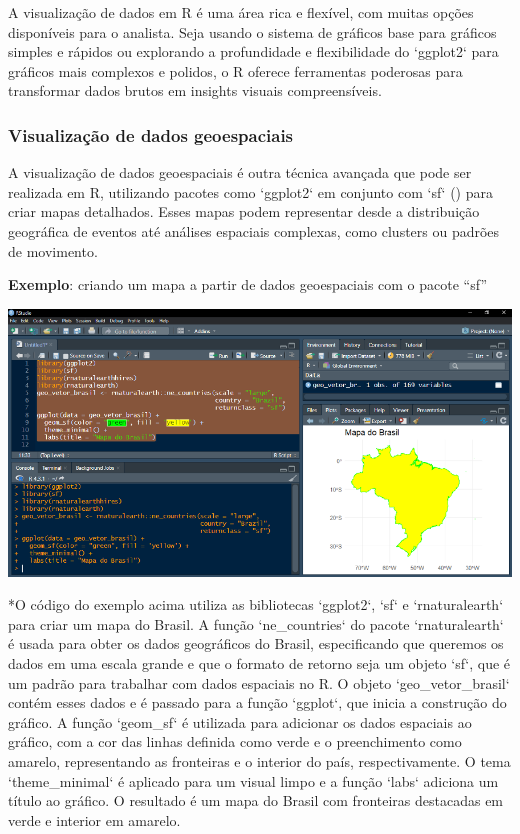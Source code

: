 \documentclass[
]{book}
\begin{document}
A visualização de dados em R é uma área rica e flexível, com muitas opções disponíveis para o analista. Seja usando o sistema de gráficos base para gráficos simples e rápidos ou explorando a profundidade e flexibilidade do `ggplot2` para gráficos mais complexos e polidos, o R oferece ferramentas poderosas para transformar dados brutos em insights visuais compreensíveis.

\subsubsection{Visualização de dados geoespaciais}\label{visualizauxe7uxe3o-de-dados-geoespaciais}

A visualização de dados geoespaciais é outra técnica avançada que pode ser realizada em R, utilizando pacotes como `ggplot2` em conjunto com `sf` () para criar mapas detalhados. Esses mapas podem representar desde a distribuição geográfica de eventos até análises espaciais complexas, como clusters ou padrões de movimento.

\textbf{Exemplo}: criando um mapa a partir de dados geoespaciais com o pacote ``sf''

\includegraphics{images/clipboard-3449562011.png}

*O código do exemplo acima utiliza as bibliotecas `ggplot2`, `sf` e `rnaturalearth` para criar um mapa do Brasil. A função `ne\_countries` do pacote `rnaturalearth` é usada para obter os dados geográficos do Brasil, especificando que queremos os dados em uma escala grande e que o formato de retorno seja um objeto `sf`, que é um padrão para trabalhar com dados espaciais no R. O objeto `geo\_vetor\_brasil` contém esses dados e é passado para a função `ggplot`, que inicia a construção do gráfico. A função `geom\_sf` é utilizada para adicionar os dados espaciais ao gráfico, com a cor das linhas definida como verde e o preenchimento como amarelo, representando as fronteiras e o interior do país, respectivamente. O tema `theme\_minimal` é aplicado para um visual limpo e a função `labs` adiciona um título ao gráfico. O resultado é um mapa do Brasil com fronteiras destacadas em verde e interior em amarelo.
\end{document}
